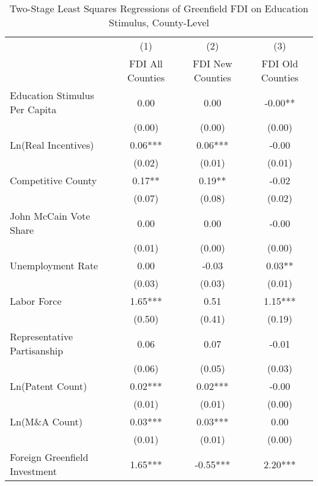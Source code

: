 \begin{table}[!htbp]\centering
\def\sym#1{\ifmmode^{#1}\else\(^{#1}\)\fi}
\caption{Two-Stage Least Squares Regressions of Greenfield FDI on Education Stimulus, County-Level}
\begin{tabular}{l*{3}{c}}
\hline\hline
                    &\multicolumn{1}{c}{(1)}   &\multicolumn{1}{c}{(2)}   &\multicolumn{1}{c}{(3)}   \\
                    &FDI All Counties   &FDI New Counties   &FDI Old Counties   \\
\hline
Education Stimulus Per Capita&        0.00   &        0.00   &       -0.00** \\
                    &      (0.00)   &      (0.00)   &      (0.00)   \\
Ln(Real Incentives) &        0.06***&        0.06***&       -0.00   \\
                    &      (0.02)   &      (0.01)   &      (0.01)   \\
Competitive County  &        0.17** &        0.19** &       -0.02   \\
                    &      (0.07)   &      (0.08)   &      (0.02)   \\
John McCain Vote Share&        0.00   &        0.00   &       -0.00   \\
                    &      (0.01)   &      (0.00)   &      (0.00)   \\
Unemployment Rate   &        0.00   &       -0.03   &        0.03** \\
                    &      (0.03)   &      (0.03)   &      (0.01)   \\
Labor Force         &        1.65***&        0.51   &        1.15***\\
                    &      (0.50)   &      (0.41)   &      (0.19)   \\
Representative Partisanship&        0.06   &        0.07   &       -0.01   \\
                    &      (0.06)   &      (0.05)   &      (0.03)   \\
Ln(Patent Count)    &        0.02***&        0.02***&       -0.00   \\
                    &      (0.01)   &      (0.01)   &      (0.00)   \\
Ln(M\&A Count)      &        0.03***&        0.03***&        0.00   \\
                    &      (0.01)   &      (0.01)   &      (0.00)   \\
Foreign Greenfield Investment&        1.65***&       -0.55***&        2.20***\\

\end{tabular}
\end{table}

